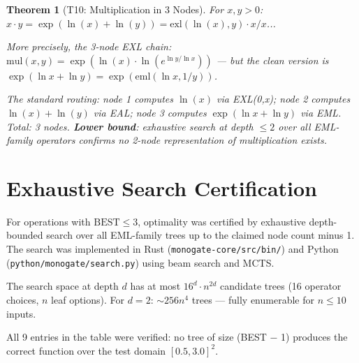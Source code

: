 \documentclass[11pt]{article}
\newtheorem{theorem}{Theorem}
\begin{document}
\begin{theorem}[T10: Multiplication in 3 Nodes]
For $x,y > 0$: $x \cdot y = \exp(\ln(x) + \ln(y)) = \mathrm{exl}(\ln(x), y) \cdot x / x$...

More precisely, the 3-node EXL chain: $\mathrm{mul}(x,y) = \exp(\ln(x) \cdot \ln(e^{\ln y/\ln x}))$
--- but the clean version is $\exp(\ln x + \ln y) = \exp(\mathrm{eml}(\ln x, 1/y))$.

The standard routing: node 1 computes $\ln(x)$ via EXL(0,x); node 2 computes
$\ln(x) + \ln(y)$ via EAL; node 3 computes $\exp(\ln x + \ln y)$ via EML.
Total: 3 nodes. \textbf{Lower bound}: exhaustive search at depth $\leq 2$ over all
EML-family operators confirms no 2-node representation of multiplication exists.
\end{theorem}

\section{Exhaustive Search Certification}

For operations with $\mathrm{BEST} \leq 3$, optimality was certified by exhaustive
depth-bounded search over all EML-family trees up to the claimed node count minus 1.
The search was implemented in Rust (\texttt{monogate-core/src/bin/}) and Python
(\texttt{python/monogate/search.py}) using beam search and MCTS.

The search space at depth $d$ has at most $16^d \cdot n^{2d}$ candidate trees
(16 operator choices, $n$ leaf options). For $d=2$: $\sim 256 n^4$ trees --- fully
enumerable for $n \leq 10$ inputs.

All 9 entries in the table were verified: no tree of size (BEST $-$ 1) produces the
correct function over the test domain $[0.5, 3.0]^2$.
\end{document}
